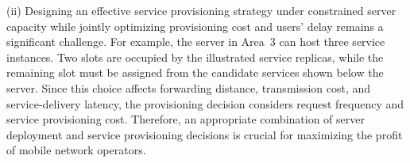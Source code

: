 \documentclass[10pt, conference, letterpaper]{IEEEtran}
\begin{document}
(ii) Designing an effective service provisioning strategy under constrained server capacity while jointly optimizing provisioning cost and users' delay remains a significant challenge. For example, the server in Area~3 can host three service instances. Two slots are occupied by the illustrated service replicas, while the remaining slot must be assigned from the candidate services shown below the server. Since this choice affects forwarding distance, transmission cost, and service-delivery latency, the provisioning decision considers request frequency and service provisioning cost. Therefore, an appropriate combination of server deployment and service provisioning decisions is crucial for maximizing the profit of mobile network operators.

\end{document}
